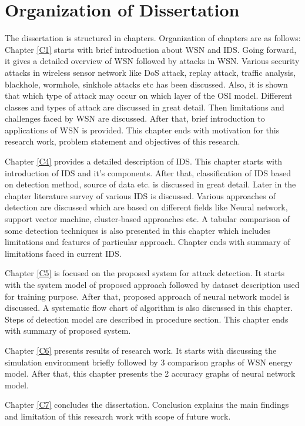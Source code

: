 \section{Organization of Dissertation}
The dissertation is structured in chapters. Organization of chapters are as follows:
\\
\noindent Chapter \ref{C1} starts with brief introduction about WSN and IDS. Going forward, it gives a detailed overview of WSN followed by attacks in WSN. Various security attacks in wireless sensor network like DoS attack, replay attack, traffic analysis, blackhole, wormhole, sinkhole attacks etc has been discussed. Also, it is shown that which type of attack may occur on which layer of the OSI model. Different classes and types of attack are discussed in great detail. Then limitations and challenges faced by WSN are discussed. After that, brief introduction to applications of WSN is provided. This chapter ends with motivation for this research work, problem statement and objectives of this research. 
\par Chapter \ref{C4} provides a detailed description of IDS. This chapter starts with introduction of IDS and it's components. After that, classification  of IDS based on detection method, source of data etc. is discussed in great detail. Later in the chapter literature survey of various IDS is discussed. Various approaches of detection are discussed which are based on different fields like Neural network, support vector machine, cluster-based approaches etc. A tabular comparison of some detection techniques is also presented in this chapter which includes limitations and features of particular approach. Chapter ends with summary of limitations faced in current IDS.
\par Chapter \ref{C5} is focused on the proposed system for attack detection. It starts with the system model of proposed approach followed by dataset description used for training purpose. After that, proposed approach of neural network model is discussed. A systematic flow chart of algorithm is also discussed in this chapter. Steps of detection model are described in procedure section. This chapter ends with summary of proposed system.
\par Chapter \ref{C6} presents results of research work. It starts with discussing the simulation environment briefly followed by 3 comparison graphs of WSN energy model. After that, this chapter presents the 2 accuracy graphs of neural network model.
\par Chapter \ref{C7} concludes the dissertation. Conclusion explains the main findings and limitation of this research work with scope of future work.
